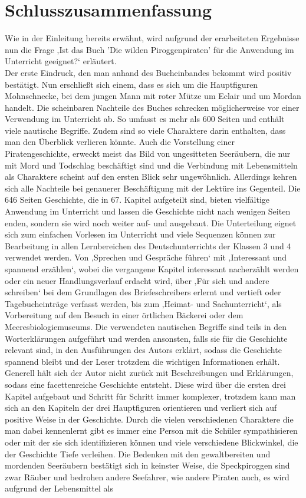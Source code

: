 \chapter{Schlusszusammenfassung}

Wie in der Einleitung bereits erwähnt, wird aufgrund der erarbeiteten Ergebnisse nun die Frage ‚Ist das Buch 'Die wilden Piroggenpiraten' für die Anwendung im Unterricht geeignet?‘ erläutert.
\\
Der erste Eindruck, den man anhand des Bucheinbandes bekommt wird positiv bestätigt. Nun erschließt sich einem, dass es sich um die Hauptfiguren Mohnschnecke, bei dem jungen Mann mit roter Mütze um Eclair und um Mordan handelt. 
Die scheinbaren Nachteile des Buches schrecken möglicherweise vor einer Verwendung im Unterricht ab. So umfasst es mehr als 600 Seiten und enthält viele nautische Begriffe. Zudem sind so viele Charaktere darin enthalten, dass man den Überblick verlieren könnte. Auch die Vorstellung einer Piratengeschichte, erweckt meist das Bild von ungesitteten Seeräubern, die nur mit Mord und Todschlag beschäftigt sind und die Verbindung mit Lebensmitteln als Charaktere scheint auf den ersten Blick sehr ungewöhnlich. Allerdings kehren sich alle Nachteile bei genauerer Beschäftigung mit der Lektüre ins Gegenteil. Die 646 Seiten Geschichte, die in 67. Kapitel aufgeteilt sind, bieten vielfältige Anwendung im Unterricht und lassen die Geschichte nicht nach wenigen Seiten enden, sondern sie wird noch weiter auf- und ausgebaut. Die Unterteilung eignet sich zum einfachen Vorlesen im Unterricht und viele Sequenzen können zur Bearbeitung in allen Lernbereichen des Deutschunterrichts der Klassen 3 \cite[S.172ff]{LP GS 2000} und 4 \cite[S.246ff]{LP GS 2000}  verwendet werden. Von ‚Sprechen und Gespräche führen‘ mit ‚Interessant und spannend erzählen‘, wobei die vergangene Kapitel interessant nacherzählt werden oder ein neuer Handlungsverlauf erdacht wird, über ‚Für sich und andere schreiben‘ bei dem Grundlagen des Briefeschreibers erlernt und vertieft oder Tagebucheinträge verfasst werden, bis zum ‚Heimat- und Sachunterricht‘, als Vorbereitung auf den Besuch in einer örtlichen Bäckerei oder dem Meeresbiologiemuseums. Die verwendeten nautischen Begriffe sind teils in den Worterklärungen \cite[S.647]{pir} aufgeführt und werden ansonsten, falls sie für die Geschichte relevant sind, in den Ausführungen des Autors erklärt, sodass die Geschichte spannend bleibt und der Leser trotzdem die wichtigen Informationen erhält. Generell hält sich der Autor nicht zurück mit Beschreibungen und Erklärungen, sodass eine facettenreiche Geschichte entsteht. Diese wird über die ersten drei Kapitel aufgebaut und Schritt für Schritt immer komplexer, trotzdem kann man sich an den Kapiteln der drei Hauptfiguren orientieren und verliert sich auf positive Weise in der Geschichte. Durch die vielen verschiedenen Charaktere die man dabei kennenlernt gibt es immer eine Person mit die Schüler sympathisieren oder mit der sie sich identifizieren können und viele verschiedene Blickwinkel, die der Geschichte Tiefe verleihen. Die Bedenken mit den gewaltbereiten und mordenden Seeräubern bestätigt sich in keinster Weise, die Speckpiroggen sind zwar Räuber und bedrohen andere Seefahrer, wie andere Piraten auch, es wird aufgrund der Lebensmittel als 